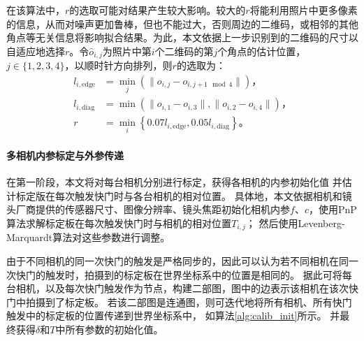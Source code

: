 在该算法中，$r$的选取可能对结果产生较大影响。较大的$r$将能利用照片中更多像素的信息，从而对噪声更加鲁棒，但也不能过大，否则周边的二维码，或相邻的其他角点等无关信息将影响拟合结果。为此，本文依据上一步识别到的二维码的尺寸以自适应地选择$r$。令$\hat{o}_{i,j}$为照片中第$i$个二维码的第$j$个角点的估计位置，$j\in\{1,2,3,4\}$，以顺时针方向排列，则$r$的选取为：
\begin{equation}
    \label{eq:r}
    \begin{aligned}
        l_{i,\textrm{edge}} & = \min_j\left(\|o_{i,j} - o_{i,j+1\mod 4}\|\right)\text{，} \\
        l_{i,\textrm{diag}} & = \min\left(\|o_{i,1} - o_{i,3}\|, \|o_{i,2} - o_{i,4}\|\right)\text{，} \\
        r & = \min_i\left\{0.07 l_{i,\textrm{edge}}, 0.05 l_{i,\textrm{diag}}\right\}\text{。}
    \end{aligned}
\end{equation}

\paragraph{多相机内参标定与外参传递}
在第一阶段，本文将对每台相机分别进行标定，获得各相机的内参初始化值
并估计标定版在每次触发快门时与各台相机的相对位置。
具体地，本文依据相机和镜头厂商提供的传感器尺寸、图像分辨率、镜头焦距初始化相机内参$f$、$c$，使用PnP算法求解标定板在每次触发快门时与相机的相对位置$T_{i,j}$；
然后使用Levenberg-Marquardt算法对这些参数进行调整。

由于不同相机的同一次快门的触发是严格同步的，因此可以认为若不同相机在同一次快门的触发时，拍摄到的标定板在世界坐标系中的位置是相同的。
据此可将每台相机，以及每次快门触发作为节点，构建二部图，图中的边表示该相机在该次快门中拍摄到了标定板。
若该二部图是连通图，则可迭代地将所有相机、所有快门触发中的标定板的位置传递到世界坐标系中，
如算法\ref{alg:calib_init}所示。
并最终获得$\delta$和$T$中所有参数的初始化值。

